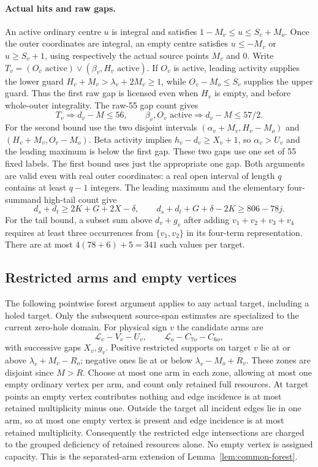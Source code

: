 \documentclass[11pt,letterpaper]{article}
\theoremstyle{definition}\newtheorem{definition}[theorem]{Definition}
\begin{document}
\paragraph{Actual hits and raw gaps.}
An active ordinary centre $u$ is integral and satisfies $1-M_v\le u\le S_v+M_o$. Once the outer coordinates are integral, an empty centre satisfies $u\le-M_v$ or $u\ge S_v+1$, using respectively the actual source points $M_v$ and $0$.
Write $T_v=(O_v\text{ active})\lor(\beta_v,H_v\text{ active})$.
If $O_v$ is active, leading activity supplies the lower guard $H_v+M_v>\lambda_v+2M_v\ge1$, while $O_v-M_o\le S_v$ supplies the upper guard. Thus the first raw gap is licensed even when $H_v$ is empty, and before whole-outer integrality. The raw-55 gap count gives
\begin{equation}\label{eq:z-caps}
 T_v\Longrightarrow d_v-M\le56,\qquad
 \beta_v,O_v\text{ active}\Longrightarrow d_v-M\le57/2.
\end{equation}
For the second bound use the two disjoint intervals
$(\alpha_v+M_v,H_v-M_o)$ and $(H_v+M_v,O_v-M_o)$.
Beta activity implies $h_v-d_v\ge X_v+1$, so $\alpha_v>U_v$ and the leading maximum is below the first gap. These two gaps use one set of 55 fixed labels. The first bound uses just the appropriate one gap. Both arguments are valid even with real outer coordinates: a real open interval of length $q$ contains at least $q-1$ integers.
The leading maximum and the elementary four-summand high-tail count give
\begin{equation}\label{eq:z-tail}
 d_s+d_t\ge2K+G+2X-\delta,
 \qquad d_s+d_t+G+\delta-2K\ge806-78j.
\end{equation}
For the tail bound, a subset sum above $d_v+g_v$ after adding $v_1+v_2+v_3+v_4$ requires at least three occurrences from $\{v_1,v_2\}$ in its four-term representation. There are at most $4(78+6)+5=341$ such values per target.

\subsection{Restricted arms and empty vertices}\label{sec:separated-arms}
The following pointwise forest argument applies to any actual target, including a holed target. Only the subsequent source-span estimates are specialized to the current zero-hole domain.
For physical sign $v$ the candidate arms are
\[
 \mathcal L_v-V_v-U_v,\qquad \mathcal L_o-C_{7o}-C_{6o},
\]
with successive gaps $X_v,g_v$. Positive restricted supports on target $v$ lie at or above $\lambda_v+M_v-R_o$; negative ones lie at or below $\lambda_v-M_o+R_v$. These zones are disjoint since $M>R$.
Choose at most one arm in each zone, allowing at most one empty ordinary vertex per arm, and count only retained full resources. At target points an empty vertex contributes nothing and edge incidence is at most retained multiplicity minus one. Outside the target all incident edges lie in one arm, so at most one empty vertex is present and edge incidence is at most retained multiplicity. Consequently the restricted edge intersections are charged to the grouped deficiency of retained resources alone. No empty vertex is assigned capacity. This is the separated-arm extension of Lemma~\ref{lem:common-forest}.
\end{document}
